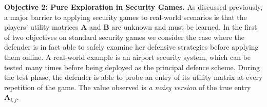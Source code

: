  
\textbf{Objective 2: Pure Exploration in Security Games.}
As discussed previously, a major barrier to applying security games to real-world scenarios is that the players' utility matrices $\boldsymbol A$ and $\boldsymbol B$ are unknown and must be learned. In the first of two objectives on standard security games we consider the case where the defender is in fact able to safely examine her defensive strategies before applying them online. A  real-world example is an airport security system, which can be tested many times before being deployed as the principal defence scheme.  
%
During the test phase, the defender is able to probe an entry of its utility matrix at every repetition of the game. The value observed is {\em a noisy version} of the true entry $\boldsymbol A_{i,j}$. 
%
 

